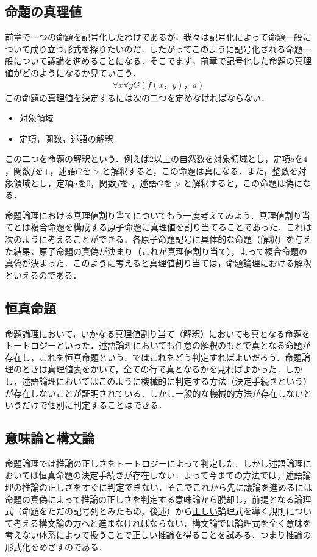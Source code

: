 \documentclass[10pt,b5paper,papersize,dvipdfmx]{jsbook}
\begin{document}
\subsection{命題の真理値}
前章で一つの命題を記号化したわけであるが，我々は記号化によって命題一般について成り立つ形式を探りたいのだ．したがってこのように記号化される命題一般について議論を進めることになる．そこでまず，前章で記号化した命題の真理値がどのようになるか見ていこう．
\begin{align*}
\forall x\forall yG(f(x，y)，a)
\end{align*}
この命題の真理値を決定するには次の二つを定めなければならない．
\begin{itemize}
\item 対象領域
\item 定項，関数，述語の解釈
\end{itemize}
この二つを命題の解釈という．例えば$2$以上の自然数を対象領域とし，定項$a$を$4$，関数$f$を$+$，述語$G$を$>$と解釈すると，この命題は真になる．また，整数を対象領域とし，定項$a$を$0$，関数$f$を$\cdot$，述語$G$を$>$と解釈すると，この命題は偽になる． \par
命題論理における真理値割り当てについてもう一度考えてみよう．真理値割り当てとは複合命題を構成する原子命題に真理値を割り当てることであった．これは次のように考えることができる．各原子命題記号に具体的な命題（解釈）を与えた結果，原子命題の真偽が決まり（これが真理値割り当て），よって複合命題の真偽が決まった．このように考えると真理値割り当ては，命題論理における解釈といえるのである．

\subsection{恒真命題}
命題論理において，いかなる真理値割り当て（解釈）においても真となる命題をトートロジーといった．述語論理においても任意の解釈のもとで真となる命題が存在し，これを恒真命題という．ではこれをどう判定すればよいだろう．命題論理のときは真理値表をかいて，全ての行で真となるかを見ればよかった．しかし，述語論理においてはこのように機械的に判定する方法（決定手続きという）が存在しないことが証明されている．しかし一般的な機械的方法が存在しないというだけで個別に判定することはできる．

\subsection{意味論と構文論}
命題論理では推論の正しさをトートロジーによって判定した．しかし述語論理においては恒真命題の決定手続きが存在しない．よって今までの方法では，述語論理の推論の正しさをすぐに判定できない．そこでこれから先に議論を進めるには命題の真偽によって推論の正しさを判定する意味論から脱却し，前提となる論理式（命題をただの記号列とみたもの，後述）から\underline{正しい}論理式を導く規則について考える構文論の方へと進まなければならない．構文論では論理式を全く意味を考えない体系によって扱うことで正しい推論を得ることを試みる．つまり推論の形式化をめざすのである．
\end{document}

